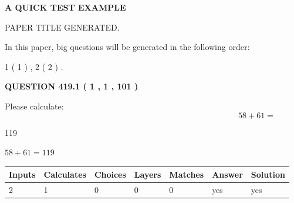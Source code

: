 \documentclass[12pt]{article}
\begin{document}
   
 \vspace{0.2in}
{\LARGE {\textbf{ A QUICK TEST EXAMPLE}}}
   
   
 PAPER TITLE GENERATED.
   
   
   
\vspace{0.2in}
   
In this paper, big questions will be generated in the following order: 
   
   
   1 ( 1 )
 ,
   2 ( 2 )
 .
  
\vspace{0.2in}
  
{\textbf{\Large{QUESTION
419.1 
 ( 1 , 1 , 101 )
}}}
  
  
 
Please calculate:
\begin{equation}
58 +  %
61 = \nonumber
\end{equation}
 
 
 
\noindent{}
 
 

119
 
 
\noindent{}
 
 

 
 
 
\noindent{}
 
 

$ %
58 +  %
61=   %
119$
 
 
\noindent{}
 
 

 
   
   
   
   
\noindent\begin{tabular}{|l|l|l|l|l|l|l|}
 \hline
Inputs & Calculates & Choices & Layers & Matches & Answer & Solution \\ \hline
 2  & 
 1  & 
 0
  & 
 0  & 
 0  & 
  yes & 
  yes 
  \\ \hline
 \end{tabular}
   
   
   
   
\noindent{}
   
\end{document}
